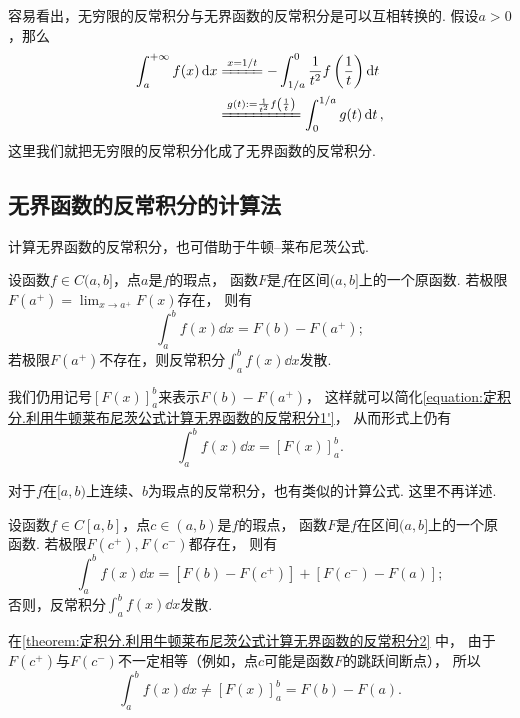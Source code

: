 容易看出，无穷限的反常积分与无界函数的反常积分是可以互相转换的.
假设\(a>0\)，那么\begin{align*}
	\int_a^{+\infty} f(x) \dd{x}
	&\xlongequal{x=1/t}
	-\int_{1/a}^0 \frac1{t^2} f\left(\frac1t\right) \dd{t} \\
	&\xlongequal{g(t) \defeq \frac1{t^2} f\left(\frac1t\right)}
	\int_0^{1/a} g(t) \dd{t},
\end{align*}
这里我们就把无穷限的反常积分化成了无界函数的反常积分.

\subsection{无界函数的反常积分的计算法}
计算无界函数的反常积分，也可借助于牛顿--莱布尼茨公式.
\begin{theorem}\label{theorem:定积分.利用牛顿莱布尼茨公式计算无界函数的反常积分1}
设函数\(f \in C(a,b]\)，点\(a\)是\(f\)的瑕点，
函数\(F\)是\(f\)在区间\((a,b]\)上的一个原函数.
若极限\(F(a^+) = \lim_{x \to a^+} F(x)\)存在，
则有
\begin{equation}\label{equation:定积分.利用牛顿莱布尼茨公式计算无界函数的反常积分1'}
	\int_a^b f(x) \dd{x}
	= F(b) - F(a^+);
\end{equation}
若极限\(F(a^+)\)不存在，则反常积分\(\int_a^b f(x) \dd{x}\)发散.
\end{theorem}
我们仍用记号\([F(x)]_a^b\)来表示\(F(b) - F(a^+)\)，
这样就可以简化\cref{equation:定积分.利用牛顿莱布尼茨公式计算无界函数的反常积分1'}，
从而形式上仍有
\begin{equation}\label{equation:定积分.利用牛顿莱布尼茨公式计算无界函数的反常积分1}
	\int_a^b f(x) \dd{x} = [F(x)]_a^b.
\end{equation}

对于\(f\)在\([a,b)\)上连续、\(b\)为瑕点的反常积分，也有类似的计算公式.
这里不再详述.

\begin{theorem}\label{theorem:定积分.利用牛顿莱布尼茨公式计算无界函数的反常积分2}
设函数\(f \in C[a,b]\)，点\(c\in(a,b)\)是\(f\)的瑕点，
函数\(F\)是\(f\)在区间\((a,b]\)上的一个原函数.
若极限\(F(c^+),F(c^-)\)都存在，
则有
\begin{equation}\label{equation:定积分.利用牛顿莱布尼茨公式计算无界函数的反常积分2}
	\int_a^b f(x) \dd{x}
	= [F(b) - F(c^+)] + [F(c^-) - F(a)];
\end{equation}
否则，反常积分\(\int_a^b f(x) \dd{x}\)发散.
\end{theorem}
在\cref{theorem:定积分.利用牛顿莱布尼茨公式计算无界函数的反常积分2} 中，
由于\(F(c^+)\)与\(F(c^-)\)不一定相等（例如，点\(c\)可能是函数\(F\)的跳跃间断点），
所以\[
	\int_a^b f(x) \dd{x}
	\neq [F(x)]_a^b = F(b) - F(a).
\]

